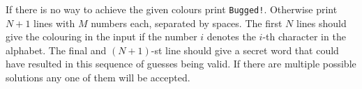

If there is no way to achieve the given colours print \texttt{Bugged!}.
Otherwise print $N + 1$ lines with $M$ numbers each, separated by spaces.
The first $N$ lines should give the colouring in the input if the number $i$ 
denotes the $i$-th character in the alphabet. The final and $(N+1)$-st line
should give a secret word that could have resulted in this sequence of
guesses being valid. If there are multiple possible solutions any one of them 
will be accepted.

